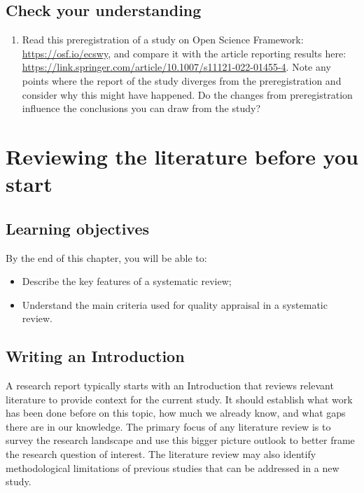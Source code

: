 \documentclass{krantz}
\providecommand{\tightlist}{%
\setlength{\itemsep}{0pt}\setlength{\parskip}{0pt}}
\begin{document}
\hypertarget{check-your-understanding-21}{%
\section{Check your understanding}\label{check-your-understanding-21}}

\begin{enumerate}
\def\labelenumi{\arabic{enumi}.}
\tightlist
\item
  Read this preregistration of a study on Open Science Framework: \url{https://osf.io/ecswy}, and compare it with the article reporting results here: \url{https://link.springer.com/article/10.1007/s11121-022-01455-4}. Note any points where the report of the study diverges from the preregistration and consider why this might have happened. Do the changes from preregistration influence the conclusions you can draw from the study?
\end{enumerate}

\hypertarget{litrev}{%
\chapter{Reviewing the literature before you start}\label{litrev}}

\hypertarget{learning-objectives-21}{%
\section{Learning objectives}\label{learning-objectives-21}}

By the end of this chapter, you will be able to:

\begin{itemize}
\item
  Describe the key features of a systematic review;
\item
  Understand the main criteria used for quality appraisal in a systematic review.
\end{itemize}

\hypertarget{writing-an-introduction}{%
\section{Writing an Introduction}\label{writing-an-introduction}}

A research report typically starts with an Introduction that reviews relevant literature to provide context for the current study. It should establish what work has been done before on this topic, how much we already know, and what gaps there are in our knowledge. The primary focus of any literature review is to survey the research landscape and use this bigger picture outlook to better frame the research question of interest. The literature review may also identify methodological limitations of previous studies that can be addressed in a new study.
\end{document}
